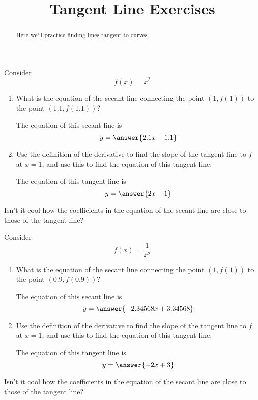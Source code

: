 \documentclass[handout]{ximera}
\title[Exercises:]{Tangent Line Exercises}
\begin{document}
\begin{abstract}
  Here we'll practice finding lines tangent to curves.
\end{abstract}
\maketitle

\begin{exercise}
Consider 
\[
f(x) = x^2
\]

\begin{enumerate}
\item What is the equation of the secant line connecting the point $(1,f(1))$ to the point $(1.1,f(1.1))$? 
\begin{prompt} 
The equation of this secant line is
$$ y = \answer{ 2.1x - 1.1}$$ 
\end{prompt}

\item  Use the definition of the derivative to find the slope of the tangent line to $f$ at $x=1$, and use this to find the equation of this tangent line.

\begin{prompt} 
The equation of this tangent line is
$$ y = \answer{ 2x - 1}$$ 
\end{prompt}

\end{enumerate}

Isn't it cool how the coefficients in the equation of the secant line are close to those of the tangent line?
\end{exercise}

\begin{exercise}
Consider 
\[
f(x) = \frac{1}{x^2}
\]

\begin{enumerate}
\item What is the equation of the secant line connecting the point $(1,f(1))$ to the point $(0.9,f(0.9))$? 
\begin{prompt} 
The equation of this secant line is
$$ y = \answer{ -2.34568x+ 3.34568}$$ 
\end{prompt}

\item  Use the definition of the derivative to find the slope of the tangent line to $f$ at $x=1$, and use this to find the equation of this tangent line.

\begin{prompt} 
The equation of this tangent line is
$$ y = \answer{ -2x + 3}$$ 
\end{prompt}

\end{enumerate}

Isn't it cool how the coefficients in the equation of the secant line are close to those of the tangent line?
\end{exercise}
\end{document}
